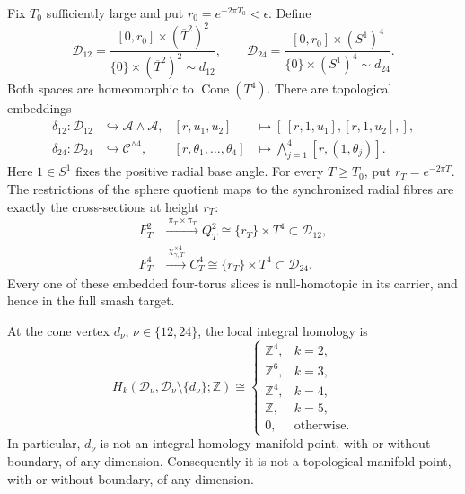 \begin{proposition}
\label{cusp-cone-explicit-carriers}
Fix \(T_0\) sufficiently large and put
\(r_0=e^{-2\pi T_0}<\epsilon\).  Define
\[
 \mathcal D_{12}
 =\frac{[0,r_0]\times(\overline T^2)^2}
 {\{0\}\times(\overline T^2)^2\sim d_{12}},
 \qquad
 \mathcal D_{24}
 =\frac{[0,r_0]\times(S^1)^4}
 {\{0\}\times(S^1)^4\sim d_{24}}.
\]
Both spaces are homeomorphic to \(\operatorname{Cone}(T^4)\).  There are
topological embeddings
\begin{align}
 \delta_{12}:\mathcal D_{12}&\hookrightarrow
 \mathcal A\wedge\mathcal A,
 &
 [r,u_1,u_2]&\longmapsto
 [\,[r,1,u_1],[r,1,u_2],],
 \label{cusp-cone-D12-embedding}\\
 \delta_{24}:\mathcal D_{24}&\hookrightarrow
 \mathcal C^{\wedge4},
 &
 [r,\theta_1,\ldots,\theta_4]&\longmapsto
 \bigwedge_{j=1}^4[r,(1,\theta_j)].
 \label{cusp-cone-D24-embedding}
\end{align}
Here \(1\in S^1\) fixes the positive radial base angle.  For every
\(T\geq T_0\), put \(r_T=e^{-2\pi T}\).  The restrictions of the sphere
quotient maps to the synchronized radial fibres are exactly the
cross-sections at height \(r_T\):
\begin{align}
 F_T^2&\xrightarrow{\ \pi_T\times\pi_T\ }
 Q_T^2\cong\{r_T\}\times T^4
 \subset\mathcal D_{12},
 \label{cusp-cone-D12-slice}\\
 F_T^4&\xrightarrow{\ \chi_{\gamma,T}^{\times4}\ }
 C_T^4\cong\{r_T\}\times T^4
 \subset\mathcal D_{24}.
 \label{cusp-cone-D24-slice}
\end{align}
Every one of these embedded four-torus slices is null-homotopic in its
carrier, and hence in the full smash target.

At the cone vertex \(d_\nu\), \(\nu\in\{12,24\}\), the local integral
homology is
\begin{equation}
 H_k(\mathcal D_\nu,
       \mathcal D_\nu\setminus\{d_\nu\};\mathbb Z)
 \cong
 \begin{cases}
  \mathbb Z^4,&k=2,\\
  \mathbb Z^6,&k=3,\\
  \mathbb Z^4,&k=4,\\
  \mathbb Z,&k=5,\\
  0,&\text{otherwise}.
 \end{cases}
 \label{cusp-cone-carrier-local-homology}
\end{equation}
In particular, \(d_\nu\) is not an integral homology-manifold point, with or
without boundary, of any dimension.  Consequently it is not a topological
manifold point, with or without boundary, of any dimension.
\end{proposition}

